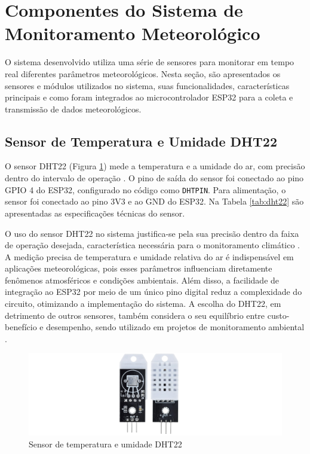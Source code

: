 \section{Componentes do Sistema de Monitoramento Meteorológico}

O sistema desenvolvido utiliza uma série de sensores para monitorar em tempo real diferentes parâmetros meteorológicos. Nesta seção, são apresentados os sensores e módulos utilizados no sistema, suas funcionalidades, características principais e como foram integrados ao microcontrolador ESP32 para a coleta e transmissão de dados meteorológicos.

\subsection{Sensor de Temperatura e Umidade DHT22}

O sensor DHT22 (Figura \ref{figura:dht22}) mede a temperatura e a umidade do ar, com precisão dentro do intervalo de operação \parencite{DHT22}. O pino de saída do sensor foi conectado ao pino GPIO 4 do ESP32, configurado no código como \texttt{DHTPIN}. Para alimentação, o sensor foi conectado ao pino 3V3 e ao GND do ESP32. Na Tabela \ref{tab:dht22} são apresentadas as especificações técnicas do sensor.

O uso do sensor DHT22 no sistema justifica-se pela sua precisão dentro da faixa de operação desejada, característica necessária para o monitoramento climático \parencite{DHT22}. A medição precisa de temperatura e umidade relativa do ar é indispensável em aplicações meteorológicas, pois esses parâmetros influenciam diretamente fenômenos atmosféricos e condições ambientais. Além disso, a facilidade de integração ao ESP32 por meio de um único pino digital reduz a complexidade do circuito, otimizando a implementação do sistema. A escolha do DHT22, em detrimento de outros sensores, também considera o seu equilíbrio entre custo-benefício e desempenho, sendo utilizado em projetos de monitoramento ambiental \parencite{ferrandez2018precision,Francisco_precision2024}.

\begin{figure}[!htb] \centering
  \caption{Sensor de temperatura e umidade DHT22} \label{figura:dht22}
  \begin{varwidth}{\linewidth}
    \includegraphics[width=16cm]{figuras/DHT22.png}
  \end{varwidth}
\end{figure}

